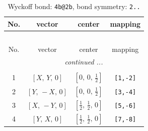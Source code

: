 \documentclass[fleqn,8pt]{jsarticle}
\begin{document}
\renewcommand{\arraystretch}{1.2}
\begin{longtable}{cccc}
\caption{Wyckoff bond: {\tt 4b@2b}, bond symmetry: {\tt 2..}}
 \\
 \hline \hline
No. & vector & center & mapping \\ \hline \endfirsthead

\multicolumn{3}{l}{\tablename\ \thetable{}} \\
 \hline \hline
No. & vector & center & mapping \\ \hline \endhead

 \hline \hline
\multicolumn{3}{r}{\footnotesize\it continued ...} \\ \endfoot

 \hline \hline
\multicolumn{3}{r}{} \\ \endlastfoot

1 & $\left[ X,\, Y,\, 0 \right]$ & $\left[ 0,\, 0,\, \frac{1}{2} \right]$ & {\tt [1,-2]} \\ \hline
2 & $\left[ Y,\, - X,\, 0 \right]$ & $\left[ 0,\, 0,\, \frac{1}{2} \right]$ & {\tt [3,-4]} \\ \hline
3 & $\left[ X,\, - Y,\, 0 \right]$ & $\left[ \frac{1}{2},\, \frac{1}{2},\, 0 \right]$ & {\tt [5,-6]} \\ \hline
4 & $\left[ Y,\, X,\, 0 \right]$ & $\left[ \frac{1}{2},\, \frac{1}{2},\, 0 \right]$ & {\tt [7,-8]} \\
\end{longtable}
\renewcommand{\arraystretch}{1.2}
\end{document}
